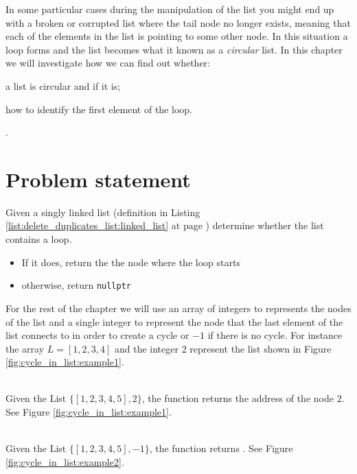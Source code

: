 In some particular cases during the manipulation of the list you might end up with a broken or corrupted list where the tail node no longer exists, meaning that
each of the elements in the list is pointing to some other node.
In this situation a loop forms and the list becomes what it known as a \textit{circular} list.
In this chapter we will investigate how we can find out whether:
\begin{enumerate*}
	\item a list is circular and if it is;
	\item how to identify the first element of the loop.
\end{enumerate*}.

\section{Problem statement}
\begin{exercise}
Given a singly linked list (definition in Listing \ref{list:delete_duplicates_list:linked_list} at
page \pageref{list:delete_duplicates_list:linked_list}) determine whether the list contains a loop.
\begin{itemize}
		\item If it does, return the the node where the loop starts
		\item otherwise, return \lstinline[columns=fixed]{nullptr}
\end{itemize}

For the rest of the chapter we will use an array of integers to represents the nodes of the list and
a single integer to represent the node that the last element of the list connects to in order to create
a cycle or $-1$ if there is no cycle. For instance  the array $L=[1,2,3,4]$ and the integer $2$
represent the list shown in Figure \ref{fig:cycle_in_list:example1}.

\begin{example}
	\hfill \\
	Given the List $\{[1,2,3,4,5],2\}$, the function returns the address of the node $2$. See Figure
	\ref{fig:cycle_in_list:example1}.
\end{example}

\begin{example}
	\hfill \\
	Given the List $\{[1,2,3,4,5],-1\}$, the function returns . See Figure
	\ref{fig:cycle_in_list:example2}.
\end{example}
\end{exercise}

